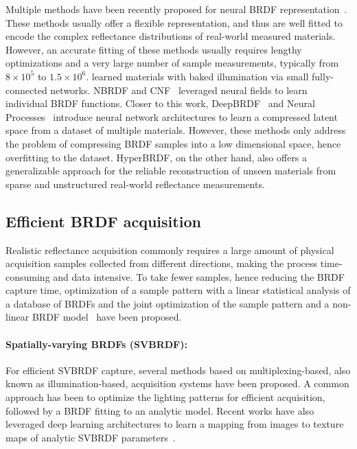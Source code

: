 Multiple methods have been recently proposed for neural BRDF representation~\cite{rainer2019neural, hu2020deepbrdf, sztrajman2021neural, zheng2021compact, maximov2019deep, chen2021invertible, fan2021neural, cnf2023}. These methods usually offer a flexible representation, and thus are well fitted to encode the complex reflectance distributions of real-world measured materials. However, an accurate fitting of these methods usually requires lengthy optimizations and a very large number of sample measurements, typically from $8 \times 10^5$ to $1.5 \times 10^6$. \cite{maximov2019deep} learned materials with baked illumination via small fully-connected networks. NBRDF \cite{sztrajman2021neural} and CNF~\cite{cnf2023} leveraged neural fields to learn individual BRDF functions. Closer to this work, DeepBRDF~\cite{hu2020deepbrdf} and Neural Processes~\cite{zheng2021compact} introduce neural network architectures to learn a compressed latent space from a dataset of multiple materials. However, these methods only address the problem of compressing BRDF samples into a low dimensional space, hence overfitting to the dataset. HyperBRDF, on the other hand, also offers a generalizable approach for the reliable reconstruction of unseen materials from sparse and unstructured real-world reflectance measurements.


\subsection{Efficient BRDF acquisition}
Realistic reflectance acquisition commonly requires a large amount of physical acquisition samples collected from different directions, making the process time-consuming and data intensive. To take fewer samples, hence reducing the BRDF capture time, optimization of a sample pattern with a linear statistical analysis of a database of BRDFs \cite{nielsen2015optimal} and the joint optimization of the sample pattern and a non-linear BRDF model~\cite{liu2023learning} have been proposed.

\paragraph{Spatially-varying BRDFs (SVBRDF):} For efficient SVBRDF capture, several methods based on multiplexing-based, also known as illumination-based, acquisition systems \cite{kang2018efficient, kang2019learning, ma2021free, ma2023opensvbrdf, tunwattanapong2013acquiring} have been proposed. A common approach has been to optimize the lighting patterns for efficient acquisition, followed by a BRDF fitting to an analytic model. Recent works have also leveraged deep learning architectures to learn a mapping from images to texture maps of analytic SVBRDF parameters~\cite{guo2021highlight, hui2017reflectance, deschaintre2018single, deschaintre2019flexible, martin2022materia, zhou2021adversarial,gao2019deep}. 

